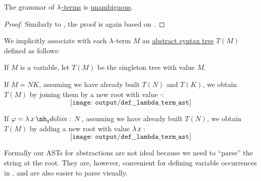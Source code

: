 \begin{proposition}\label{thm:lambda_terms_are_unambiguous}
  The grammar of \hyperref[def:untyped_lambda_term]{\( \mathrm{\lambda} \)-terms} is \hyperref[def:grammar_ambiguity]{unambiguous}.
\end{proposition}
\begin{proof}
  Similarly to , the proof is again based on .
\end{proof}

\begin{definition}\label{def:untyped_lambda_term_ast}
  We implicitly associate with each \( \mathrm{\lambda} \)-term \( M \) an \hyperref[con:abstract_syntax_tree]{abstract syntax tree} \( T(M) \) defined as follows:
  \begin{thmenum}
     If \( M \) is a variable, let \( T(M) \) be the singleton tree with value \( M \).

     If \( M = NK \), assuming we have already built \( T(N) \) and \( T(K) \), we obtain \( T(M) \) by joining them by a new root with value \( \cdot \):
    \begin{equation*}
      \texttt{[image: output/def\_\_lambda\_term\_ast]}
    \end{equation*}

     If \( \varphi = \qabs x N \), assuming we have already built \( T(N) \), we obtain \( T(M) \) by adding a new root with value \( \qabs* x \):
    \begin{equation*}
      \texttt{[image: output/def\_\_lambda\_term\_ast]}
    \end{equation*}
  \end{thmenum}
\end{definition}
\begin{comments}
  \item Formally our ASTs for abstractions are not ideal because we need to \enquote{parse} the string at the root. They are, however, convenient for defining variable occurrences in , and are also easier to parse visually.
\end{comments}

